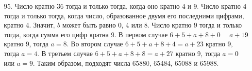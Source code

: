 95. Число кратно 36 тогда и только тогда, когда оно кратно 4 и 9. Число кратно 4 тогда и только тогда, когда число, образованное двумя его последними цифрами, кратно 4. Значит, $b$ может быть равно 0, 4 или 8. Число кратно 9 тогда и только тогда, когда сумма его цифр кратна 9. В первом случае $6+5+a+8+0=a+19$ кратно 9, тогда $a=8.$ Во втором случае $6+5+a+8+4=a+23$ кратно 9, тогда $a=4.$ В третьем случае $6+5+a+8+8=a+27$ кратно 9, тогда $a=0$ или $a=9.$ Таким образом, подходят числа 65880, 65484, 65088 и 65988.\\
